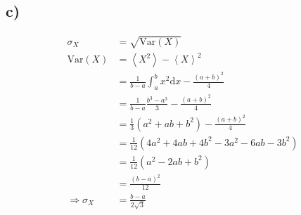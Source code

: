 \documentclass[12pt,a4paper,notitlepage]{article}
\newcommand{\diff}{\mathrm{d}}
\begin{document}
\subsection*{c)}
\begin{align}
\sigma_X&=\sqrt{\mathrm{Var}(X)}\\
\mathrm{Var}(X)&=\left<X^2\right>-\left<X\right>^2\\
&=\frac{1}{b-a}\int_a^bx^2\diff x-\frac{\left(a+b\right)^2}{4}\\
&=\frac{1}{b-a}\frac{b^3-a^3}{3}-\frac{\left(a+b\right)^2}{4}\\
&=\frac{1}{3}\left(a^2+ab+b^2\right)-\frac{\left(a+b\right)^2}{4}\\
&=\frac{1}{12}\left(4a^2+4ab+4b^2-3a^2-6ab-3b^2\right)\\
&=\frac{1}{12}\left(a^2-2ab+b^2\right)\\
&=\frac{\left(b-a\right)^2}{12}\\
\Rightarrow \sigma_X&=\frac{b-a}{2\sqrt{3}}
\end{align}
\end{document}
